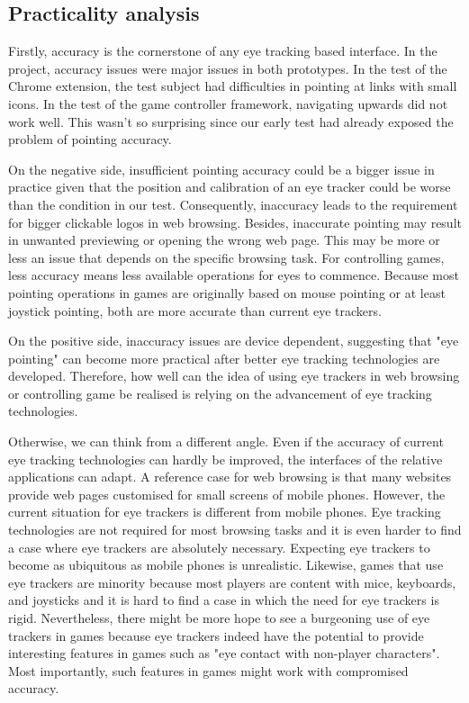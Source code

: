 \documentclass[english]{tktltiki}
\begin{document}
\subsection{Practicality analysis}

Firstly, accuracy is the cornerstone of any eye tracking based interface. In the project, accuracy issues were major issues in both prototypes. In the test of the Chrome extension, the test subject had difficulties in pointing at links with small icons. In the test of the game controller framework, navigating upwards did not work well. This wasn't so surprising since our early test had already exposed the problem of pointing accuracy. 

On the negative side, insufficient pointing accuracy could be a bigger issue in practice given that the position and calibration of an eye tracker could be worse than the condition in our test. Consequently, inaccuracy leads to the requirement for bigger clickable logos in web browsing. Besides, inaccurate pointing may result in unwanted previewing or opening the wrong web page. This may be more or less an issue that depends on the specific browsing task. For controlling games, less accuracy means less available operations for eyes to commence. Because most pointing operations in games are originally based on mouse pointing or at least joystick pointing, both are more accurate than current eye trackers.

On the positive side, inaccuracy issues are device dependent, suggesting that "eye pointing" can become more practical after better eye tracking technologies are developed. Therefore, how well can the idea of using eye trackers in web browsing or controlling game be realised is relying on the advancement of eye tracking technologies. 

Otherwise, we can think from a different angle. Even if the accuracy of current eye tracking technologies can hardly be improved, the interfaces of the relative applications can adapt. A reference case for web browsing is that many websites provide web pages customised for small screens of mobile phones. However, the current situation for eye trackers is different from mobile phones. Eye tracking technologies are not required for most browsing tasks and it is even harder to find a case where eye trackers are absolutely necessary. Expecting eye trackers to become as ubiquitous as mobile phones is unrealistic. Likewise, games that use eye trackers are minority because most players are content with mice, keyboards, and joysticks and it is hard to find a case in which the need for eye trackers is rigid. Nevertheless, there might be more hope to see a burgeoning use of eye trackers in games because eye trackers indeed have the potential to provide interesting features in games such as "eye contact with non-player characters". Most importantly, such features in games might work with compromised accuracy.
\end{document}
